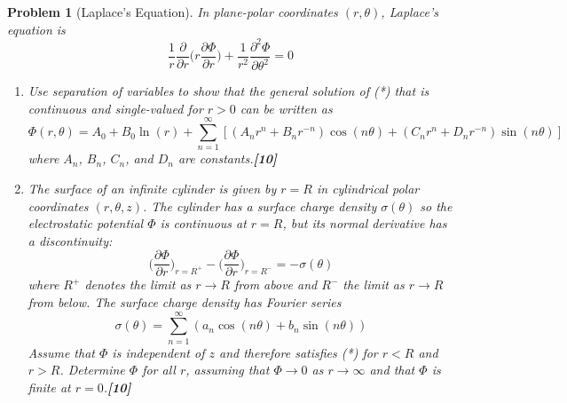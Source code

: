 \documentclass[a4paper]{article}
\theoremstyle{new}
\newtheorem{qns}{Problem}[section]
\begin{document}
\begin{qns}[Laplace's Equation]
In plane-polar coordinates $(r, \theta)$, Laplace’s equation is
\begin{equation}
\frac{1}{r}\frac{\partial}{\partial r}\bigg(r\frac{\partial\Phi}{\partial r}\bigg)+\frac{1}{r^2}\frac{\partial^2\Phi}{\partial\theta^2}=0\tag{*}
\end{equation}
\begin{enumerate}[label=(\alph*)]
\item Use separation of variables to show that the general solution of (*) that is continuous and single-valued for $r > 0$ can be written as
$$\Phi(r,\theta)=A_0+B_0\ln(r)+\sum_{n=1}^\infty[(A_nr^n+B_nr^{-n})\cos(n\theta)+(C_nr^n+D_nr^{-n})\sin(n\theta)]$$
where $A_n$, $B_n$, $C_n$, and $D_n$ are constants.\hfill\textbf{[10]}
\item The surface of an infinite cylinder is given by $r = R$ in cylindrical polar coordinates $(r,\theta,z)$. The cylinder has a surface charge density $\sigma(\theta)$ so the electrostatic potential $\Phi$ is continuous at $r = R$, but its normal derivative has a discontinuity:
$$\bigg(\frac{\partial\Phi}{\partial r}\bigg)_{r=R^+}-\bigg(\frac{\partial\Phi}{\partial r}\bigg)_{r=R^-}=-\sigma(\theta)$$
where $R^+$ denotes the limit as $r\rightarrow R$ from above and $R^−$ the limit as $r\rightarrow R$ from below. The surface charge density has Fourier series
$$\sigma(\theta)=\sum_{n=1}^\infty(a_n\cos(n\theta)+b_n\sin(n\theta))$$
Assume that $\Phi$ is independent of $z$ and therefore satisfies (*) for $r < R$ and $r > R$. Determine $\Phi$ for all $r$, assuming that $\Phi\rightarrow0$ as $r\rightarrow\infty$ and that $\Phi$ is finite at $r = 0$.\hfill\textbf{[10]}
\end{enumerate}
\end{qns}
\end{document}
